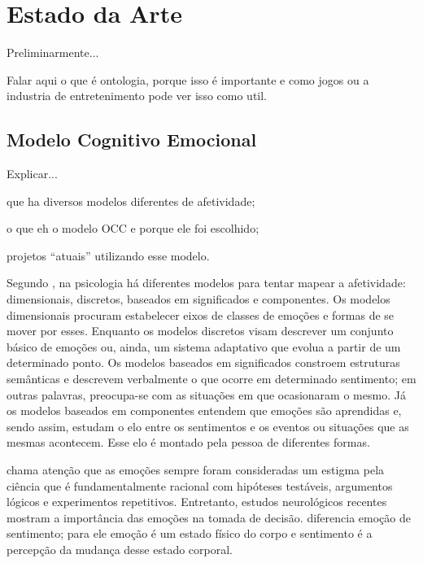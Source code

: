 \chapter{Estado da Arte} \label{cap:eda}

Preliminarmente...

Falar aqui o que é ontologia, porque isso é importante e como jogos ou a
industria de entretenimento pode ver isso como util.

\section{Modelo Cognitivo Emocional} \label{cap:eda:mce}

Explicar...

	que ha diversos modelos diferentes de afetividade;

	o que eh o modelo OCC e porque ele foi escolhido;

	projetos ``atuais'' utilizando esse modelo.

Segundo \citet{scherer2000tnoe}, na psicologia há diferentes modelos para
tentar mapear a afetividade: dimensionais, discretos, baseados em significados
e componentes. Os modelos dimensionais procuram estabelecer eixos de classes
de emoções e formas de se mover por esses.  Enquanto os modelos discretos
visam descrever um conjunto básico de emoções ou, ainda, um sistema adaptativo
que evolua a partir de um determinado ponto.  Os modelos baseados em
significados constroem estruturas semânticas e descrevem verbalmente o que
ocorre em determinado sentimento; em outras palavras, preocupa-se com as
situações em que ocasionaram o mesmo. Já os modelos baseados em componentes
entendem que emoções são aprendidas e, sendo assim, estudam o elo entre os
sentimentos e os eventos ou situações que as mesmas acontecem. Esse elo é
montado pela pessoa de diferentes formas.

\citet{Pic98} chama atenção que as emoções sempre foram consideradas um
estigma pela ciência que é fundamentalmente racional com hipóteses testáveis,
argumentos lógicos e experimentos repetitivos.  Entretanto, estudos
neurológicos recentes \cite{ledoux1998emotional,damasio2004erro} mostram a
importância das emoções na tomada de decisão.  \citet{damasio2004erro}
diferencia emoção de sentimento; para ele emoção é um estado físico do corpo e
sentimento é a percepção da mudança desse estado corporal.

